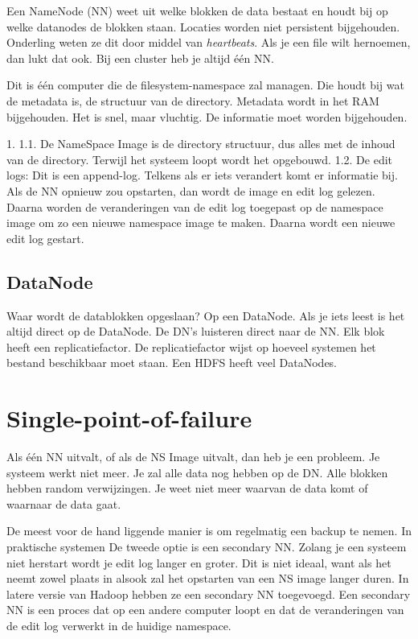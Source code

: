 \documentclass[a4paper,10pt,twoside]{report}
\begin{document}
Een NameNode (NN) weet uit welke blokken de data bestaat en houdt bij op welke datanodes de blokken staan. Locaties worden niet persistent bijgehouden. Onderling weten ze dit door middel van \textit{heartbeats}.  Als je een file wilt hernoemen, dan lukt dat ook. Bij een cluster heb je altijd één NN.

Dit is één computer die de filesystem-namespace zal managen. Die houdt bij wat de metadata is, de structuur van de directory. Metadata wordt in het RAM bijgehouden. Het is snel, maar vluchtig. De informatie moet worden bijgehouden.

1.  
1.1. De NameSpace Image is de directory structuur, dus alles met de inhoud van de directory. Terwijl het systeem loopt wordt het opgebouwd.
1.2. De edit logs: Dit is een append-log. Telkens als er iets verandert komt er informatie bij. Als de NN opnieuw zou opstarten, dan wordt de image en edit log gelezen. Daarna worden de veranderingen van de edit log toegepast op de namespace image om zo een nieuwe namespace image te maken. Daarna wordt een nieuwe edit log gestart.

\subsection{DataNode}

Waar wordt de datablokken opgeslaan? 
Op een DataNode. Als je iets leest is het altijd direct op de DataNode. De DN's luisteren direct naar de NN. Elk blok heeft een replicatiefactor. De replicatiefactor wijst op hoeveel systemen het bestand beschikbaar moet staan. Een HDFS heeft veel DataNodes.

\section{Single-point-of-failure}

Als één NN uitvalt, of als de NS Image uitvalt, dan heb je een probleem. Je systeem werkt niet meer. Je zal alle data nog hebben op de DN. Alle blokken hebben random verwijzingen. Je weet niet meer waarvan de data komt of waarnaar de data gaat.

De meest voor de hand liggende manier is om regelmatig een backup te nemen. In praktische systemen
De tweede optie is een secondary NN. Zolang je een systeem niet herstart wordt je edit log langer en groter. Dit is niet ideaal, want als het neemt zowel plaats in alsook zal het opstarten van een NS image langer duren. In latere versie van Hadoop hebben ze een secondary NN toegevoegd. Een secondary NN is een proces dat op een andere computer loopt en dat de veranderingen van de edit log verwerkt in de huidige namespace.
\end{document}
